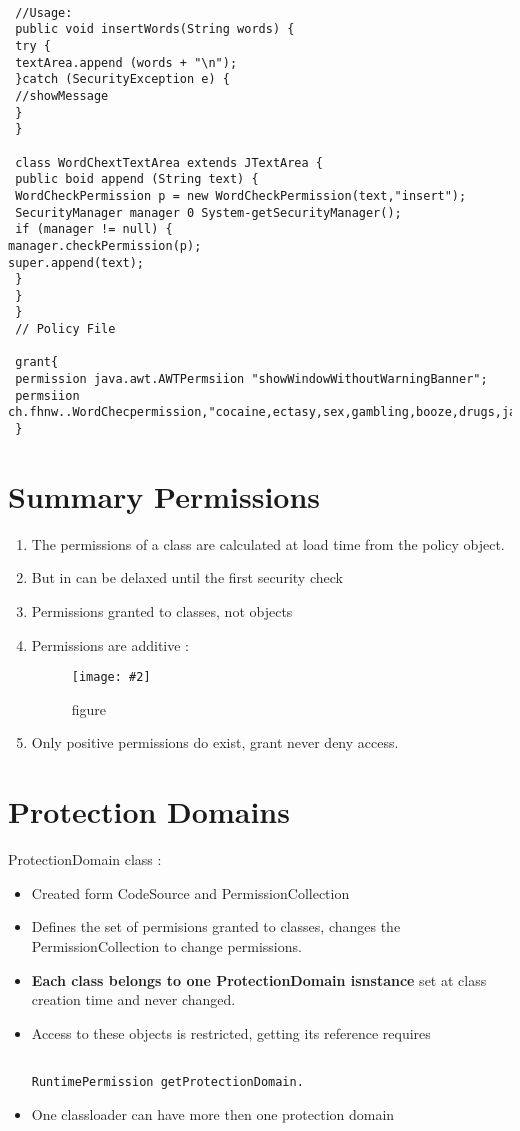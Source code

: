 \documentclass[a4paper,10pt]{scrreprt}
\newcommand{\pic}[2][figure]{\begin{figure}[h]
 \centering
 \texttt{[image: \#2]}
 \caption{#1}
\end{figure}
}
\begin{document}
\begin{itemize}
\begin{lstlisting}[caption=Custom Permission]
 
 //Usage:
 public void insertWords(String words) {
 try {
 textArea.append (words + "\n"); 
 }catch (SecurityException e) {
 //showMessage
 }
 }
 
 class WordChextTextArea extends JTextArea {
 public boid append (String text) {
 WordCheckPermission p = new WordCheckPermission(text,"insert");
 SecurityManager manager 0 System-getSecurityManager();
 if (manager != null) {
manager.checkPermission(p);
super.append(text);
 }
 }
 }
 // Policy File
 
 grant{
 permission java.awt.AWTPermsiion "showWindowWithoutWarningBanner";
 permsiion ch.fhnw..WordChecpermission,"cocaine,ectasy,sex,gambling,booze,drugs,java","avoid";
 }
\end{lstlisting}

\section{Summary Permissions}
\begin{enumerate}
 \item The permissions of a class are calculated at load time from the policy object.
 \item But in can be delaxed until the first security check
 \item Permissions granted to classes, not objects
 \item Permissions are additive : \\
 \pic{ap.png}
 \item Only positive permissions do exist, grant never deny access. 
\end{enumerate}
\end{itemize}

\section{Protection Domains}

ProtectionDomain class :
\begin{itemize}
 \item Created form CodeSource and PermissionCollection
 \item Defines the set of permisions granted to classes, changes the PermissionCollection to change permissions.
  \item \textbf{Each class belongs to one ProtectionDomain isnstance} set at class creation time and never changed.
  \item Access to these objects is restricted, getting its reference requires \begin{verbatim}
                                                                               RuntimePermission getProtectionDomain.
                                                                              \end{verbatim}
\item One classloader can have more then one protection domain
\end{itemize}
\end{document}
